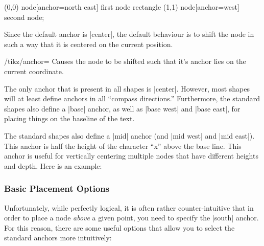 \begin{codeexample}[]
\tikz \draw           (0,0) node[anchor=north east] {first node}
            rectangle (1,1) node[anchor=west] {second node};
\end{codeexample}

Since the default anchor is |center|, the default behaviour is to
shift the node in such a way that it is centered on the current
position.

\begin{key}{/tikz/anchor=}
  Causes the node to be shifted such that it's anchor  lies on the current coordinate.

  The only anchor that is present in all shapes is |center|. However,
  most shapes will at least define anchors in all ``compass
  directions.'' Furthermore, the standard shapes also define a |base|
  anchor, as well as |base west| and |base east|, for placing things on
  the baseline of the text.

  The standard shapes also define a |mid| anchor (and |mid west| and
  |mid east|). This anchor is half the height of the character ``x''
  above the base line. This anchor is useful for vertically centering
  multiple nodes that have different heights and depth. Here is an
  example:
\begin{codeexample}[]
\end{codeexample}
\end{key}



\subsubsection{Basic Placement Options}

Unfortunately, while perfectly logical, it is often rather
counter-intuitive that in order to place a node \emph{above} a given
point, you need to specify the |south| anchor. For this reason, there
are some useful options that allow you to select the standard anchors
more intuitively:


